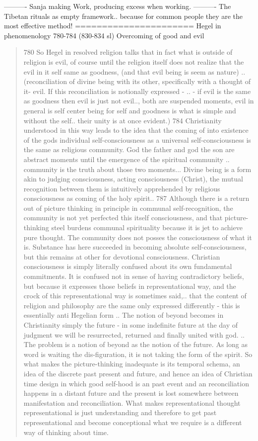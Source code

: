 \documentclass[10pt]{book}
\begin{document}
----------
Sanja making Work, producing excess when working.
----------
The Tibetan rituals as empty framework.. because for common people they are the most effective method!
======================
Hegel in phenomenology 780-784 (830-834 sl) Overcoming of good and evil
\begin{quotation}
780 So Hegel in resolved religion talks that in fact what is outside of religion is evil, of course until the religion itself does not realize that the evil in it self same as goodness, (and that evil being is seem as nature) .. (reconciliation of divine being with its other, specifically with a thought of it- evil. If this reconciliation is notionally expressed - .. - if evil is the same as goodness then evil is just not evil.., both are suspended moments, evil in general is self center being for self and goodness is what is simple and without the self.. their unity is at once evident.)
784 Christianity understood in this way leads to the idea that the coming of into existence of the gods individual self-consciousness as a universal self-consciousness is the same as religious community. God the father and god the son are abstract moments until the emergence of the spiritual community .. community is the truth about those two moments... Divine being is a form akin to judging consciousness, acting consciousness (Christ), the mutual recognition between them is intuitively apprehended by religious consciousness as coming of the holy spirit..
787 Although there is a return out of picture thinking in principle in communal self-recognition, the community is not yet perfected this itself consciousness, and that picture-thinking steel burdens communal spirituality because it is jet to achieve pure thought. The community does not posses the consciousness of what it is. Substance has here succeeded in becoming absolute self-consciousness, but this remains at other for devotional consciousness. Christian consciousness is simply literally confused about its own fundamental commitments. It is confused not in sense of having contradictory beliefs, but because it expresses those beliefs in representational way, and the crock of this representational way is sometimes said,.. that the content of religion and philosophy are the same only expressed differently - this is essentially anti Hegelian form .. The notion of beyond becomes in Christianity simply the future - in some indefinite future at the day of judgment we will be resurrected, returned and finally united with god. .. The problem is a notion of beyond as the notion of the future. As long as word is waiting the dis-figuration, it is not taking the form of the spirit. So what makes the picture-thinking inadequate is its temporal schema, an idea of the discrete past present and future, and hence an idea of Christian time design in which good self-hood is an past event and an reconciliation happens in a distant future and the present is lost somewhere between manifestation and reconciliation. What makes representational thought representational is just understanding and therefore to get past representational and become conceptional what we require is a different way of thinking about time.

\end{quotation}
\end{document}
